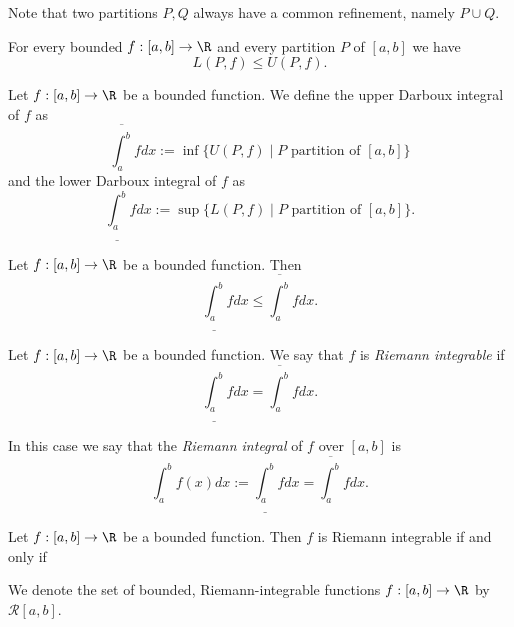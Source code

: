 Note that two partitions $P,Q$ always have a common refinement, namely $P \cup Q$.

\begin{proposition}
    For every bounded $f: [a,b] \to \R$ and every partition $P$ of $[a,b]$ we have
    $$L(P,f) \leq U(P,f).$$
\end{proposition}

\begin{definition}
    Let $f:[a,b] \to \R$ be a bounded function. We define the upper Darboux integral
    of $f$ as
    $$\overline{\int_a^b}fdx := \inf\{U(P,f) \mid P \text{ partition of } [a,b] \}$$
    and the lower Darboux integral of $f$ as
    $$\underline{\int_a^b}fdx := \sup\{L(P,f) \mid P \text{ partition of } [a,b] \}.$$
\end{definition}

\begin{proposition}
    Let $f:[a,b] \to \R$ be a bounded function. Then
    $$\underline{\int_a^b}fdx \leq \overline{\int_a^b}fdx.$$
\end{proposition}

\begin{definition}
    Let $f:[a,b] \to \R$ be a bounded function. We say that $f$ is \emph{Riemann integrable} if
    $$\underline{\int_a^b}fdx = \overline{\int_a^b}fdx.$$

    In this case we say that the \emph{Riemann integral} of $f$ over $[a,b]$ is
    $$\int_a^b f(x)dx := \underline{\int_a^b}fdx = \overline{\int_a^b}fdx.$$
\end{definition}

\begin{proposition}
    Let $f:[a,b] \to \R$ be a bounded function. Then $f$ is Riemann integrable if and only if
    \begin{myCenter}
    \end{myCenter}
\end{proposition}

\begin{definition}
    We denote the set of bounded, Riemann-integrable functions $f:[a,b] \to \R$ by
    $\mathcal R[a,b]$.
\end{definition}

